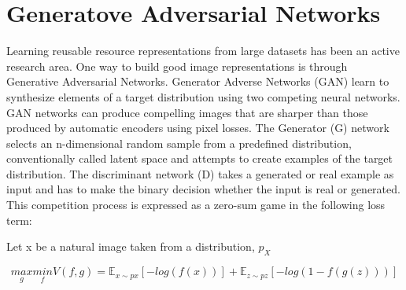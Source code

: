 \section{Generatove Adversarial Networks}

Learning reusable resource representations from large datasets has been an active research area. One way to build good image representations is through Generative Adversarial Networks. Generator Adverse Networks (GAN) learn to synthesize elements of a target distribution using two competing neural networks. GAN networks can produce compelling images that are sharper than those produced by automatic encoders using pixel losses. The Generator (G) network selects an n-dimensional random sample from a predefined distribution, conventionally called latent space and attempts to create examples of the target distribution. The discriminant network (D) takes a generated or real example as input and has to make the binary decision whether the input is real or generated. This competition process is expressed as a zero-sum game in the following loss term:

Let x be a natural image taken from a distribution, $ p_X$


\begin{equation}
    \underset{g}{max} \underset{f}{min} V(f,g)= \mathbb{E}_{x \sim px} [-log(f(x))]+\mathbb{E}_{z \sim pz}[-log(1-f(g(z)))]
\end{equation}